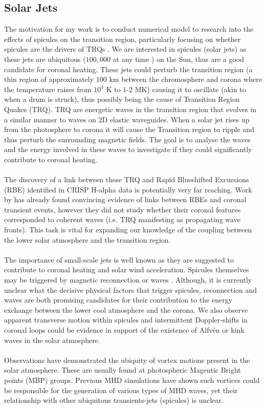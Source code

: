 \documentclass[12pt,a4paper,twoside]{article}
\newcommand{\Alfven}{Alfv\'{e}n }
\begin{document}
\subsection{Solar Jets}
The motivation for my work is to conduct numerical model to research into the effects of spicules on the transition region, particularly focusing on whether spicules are the drivers of TRQs \citep{Scullion2011}. We are interested in spicules (solar jets) as these jets are ubiquitous ($100,000$  at  any  time \citep{Beckers1968}) on the Sun, thus are a good candidate for coronal heating. These jets could perturb the transition region (a thin region of approximately $100$ km between the chromosphere and corona where the temperature raises from $10^4$ K to $1$-$2$ MK) causing it to oscillate (akin to when a drum is struck), thus possibly being the cause of Transition Region Quakes (TRQ). TRQ are energetic waves in the transition region that evolves in a similar manner to waves on 2D elastic waveguides. When a solar jet rises up from the photosphere to corona it will cause the Transition region to ripple and thus perturb the surrounding magnetic fields. The goal is to analyse the waves and the energy involved in these waves to investigate if they could significantly contribute to coronal heating. \\ \\ The discovery of a link between these TRQ and Rapid Blueshifted Excursions (RBE) identified in CRISP H-alpha data is potentially very far reaching. Work by \cite{Henriques2016} has already found convincing evidence of links between RBEs and coronal transient events, however they did not study whether their coronal features corresponded to coherent waves (i.e. TRQ manifesting as propagating wave fronts). This task is vital for expanding our knowledge of the coupling between the lower solar atmosphere and the transition region. \\ \\ The importance of small-scale jets is well known as they are suggested to contribute to coronal heating and solar wind acceleration. Spicules themselves may be triggered by magnetic reconnection \citep{Pontieu2007} or waves \citep{DePontieu2004}. Although, it is currently unclear what the decisive physical factors that trigger spicules, reconnection and waves are both promising candidates for their contribution to the energy exchange between the lower cool atmosphere and the corona. We also observe apparent transverse motion within spicules and intermittent Doppler-shifts in coronal loops could be evidence in support of the existence of \Alfven or kink waves in the solar atmosphere.  \\ \\
Observations have demonstrated the ubiquity of vortex motions present in the solar atmosphere. These are usually found at photospheric Magentic Bright points (MBP) groups. Previous MHD simulations have shown such vortices could be responsible for the generation of various types of MHD waves, yet their relationship with other ubiquitous transients-jets (spicules) is unclear.
\end{document}
